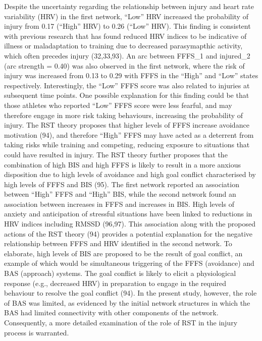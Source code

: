 \documentclass[
  english,
  man]{apa6}
\begin{document}
Despite the uncertainty regarding the relationship between injury and heart rate variability (HRV) in the first network, ``Low'' HRV increased the probability of injury from 0.17 (``High'' HRV) to 0.26 (``Low'' HRV).
This finding is consistent with previous research that has found reduced HRV indices to be indicative of illness or maladaptation to training due to decreased parasymapthic activity, which often precedes injury (32,33,93).
An arc between FFFS\_1 and injured\_2 (arc strength = 0.40) was also observed in the first network, where the risk of injury was increased from 0.13 to 0.29 with FFFS in the ``High'' and ``Low'' states respectively.
Interestingly, the ``Low'' FFFS score was also related to injuries at subsequent time points. One possible explanation for this finding could be that those athletes who reported ``Low'' FFFS score were less fearful, and may therefore engage in more risk taking behaviours, increasing the probability of injury.
The RST theory proposes that higher levels of FFFS increase avoidance motivation (94), and therefore ``High'' FFFS may have acted as a deterrent from taking risks while training and competing, reducing exposure to situations that could have resulted in injury.
The RST theory further proposes that the combination of high BIS and high FFFS is likely to result in a more anxious disposition due to high levels of avoidance and high goal conflict characterised by high levels of FFFS and BIS (95).
The first network reported an association between ``High'' FFFS and ``High'' BIS, while the second network found an association between increases in FFFS and increases in BIS. High levels of anxiety and anticipation of stressful situations have been linked to reductions in HRV indices including RMSSD (96,97).
This association along with the proposed actions of the RST theory (94) provides a potential explanation for the negative relationship between FFFS and HRV identified in the second network.
To elaborate, high levels of BIS are proposed to be the result of goal conflict, an example of which would be simultaneous triggering of the FFFS (avoidance) and BAS (approach) systems. The goal conflict is likely to elicit a physiological response (e.g., decreased HRV) in preparation to engage in the required behaviour to resolve the goal conflict (94).
In the present study, however, the role of BAS was limited, as evidenced by the initial network structures in which the BAS had limited connectivity with other components of the network.
Consequently, a more detailed examination of the role of RST in the injury process is warranted.
\end{document}

